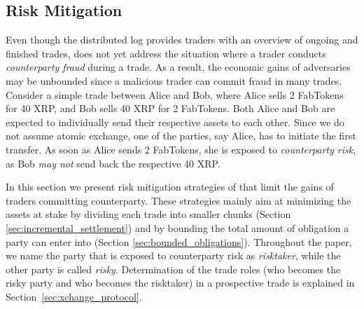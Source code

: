 \subsection{Risk Mitigation}
\label{sec:limit_risk}

Even though the distributed log provides traders with an overview of ongoing and finished trades, \ModelName{} does not yet address the situation where a trader conducts \emph{counterparty fraud} during a trade.
As a result, the economic gains of adversaries may be unbounded since a malicious trader can commit fraud in many trades.
Consider a simple trade between Alice and Bob, where Alice sells 2 FabTokens for 40 XRP, and Bob sells 40 XRP for 2 FabTokens.
Both Alice and Bob are expected to individually send their respective assets to each other. 
Since we do not assume atomic exchange, one of the parties, say Alice, has to initiate the first transfer.
As soon as Alice sends 2 FabTokens, she is exposed to \emph{counterparty risk}, as Bob \emph{may not} send back the respective 40 XRP.

In this section we present risk mitigation strategies of \ModelName{} that limit the gains of traders committing counterparty.
These strategies mainly aim at minimizing the assets at stake by dividing each trade into smaller chunks (Section \ref{sec:incremental_settlement}) and by bounding the total amount of obligation a party can enter into (Section \ref{sec:bounded_obligations}).
Throughout the paper, we name the party that is exposed to counterparty risk as \emph{risktaker}, while the other party is called \emph{risky}. 
Determination of the trade roles (who becomes the risky party and who becomes the risktaker) in a prospective trade is explained in Section~\ref{sec:xchange_protocol}.


